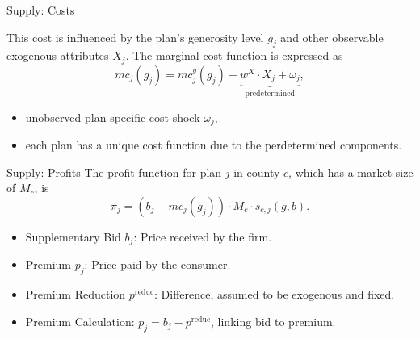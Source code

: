 \documentclass[professionalfonts, aspectratio=169]{beamer}
\begin{document}
\begin{frame}{Supply: Costs}

  This cost is influenced by the plan's generosity level $g_j$ and other observable exogenous attributes $X_j$. The marginal cost function is expressed as
  \begin{equation}
    \label{eq:marginal_cost}
    mc_j(g_j) = mc_j^g(g_j) + \underbrace{w^X \cdot X_j + \omega_j}_{\text{predetermined}},
  \end{equation}
  \begin{itemize}\small
    \item unobserved plan-specific cost shock $\omega_j$,
    \item each plan has a unique cost function due to the perdetermined components.
  \end{itemize}


\end{frame}

\begin{frame}{Supply: Profits}
  The profit function for plan $j$ in county $c$, which has a market size of $M_c$, is
  \begin{equation}
      \pi_j = (b_j - mc_j(g_j)) \cdot M_c \cdot s_{c,j}(g, b).
  \end{equation}

  \begin{itemize}\small
    \item Supplementary Bid  $b_j$: Price received by the firm.
    \item Premium $p_j$:  Price paid by the consumer.
    \item Premium Reduction $p^\text{reduc}$: Difference, assumed to be exogenous and fixed.
    \item Premium Calculation: \( p_j = b_j - p^\text{reduc} \), linking  bid to premium.
  \end{itemize}

\end{frame}
\end{document}

